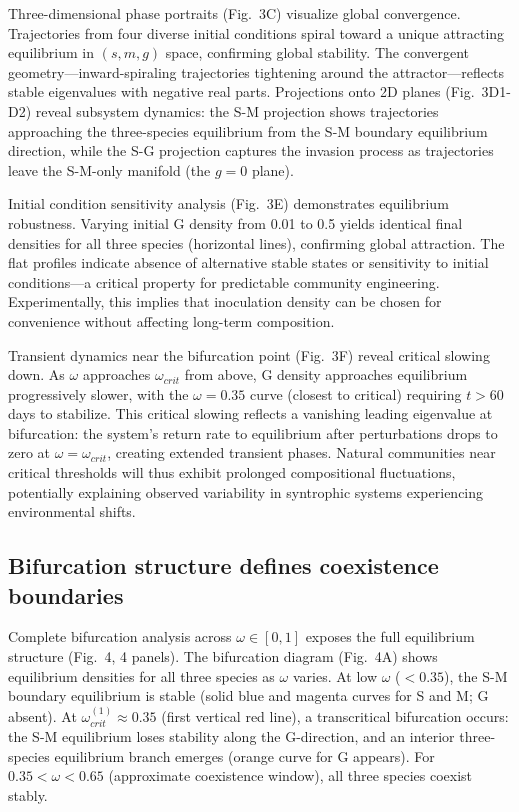 \documentclass[9pt,twocolumn,twoside]{pnas-new}
\begin{document}
Three-dimensional phase portraits (Fig.~3C) visualize global convergence. Trajectories from four diverse initial conditions spiral toward a unique attracting equilibrium in $(s, m, g)$ space, confirming global stability. The convergent geometry—inward-spiraling trajectories tightening around the attractor—reflects stable eigenvalues with negative real parts. Projections onto 2D planes (Fig.~3D1-D2) reveal subsystem dynamics: the S-M projection shows trajectories approaching the three-species equilibrium from the S-M boundary equilibrium direction, while the S-G projection captures the invasion process as trajectories leave the S-M-only manifold (the $g = 0$ plane).

Initial condition sensitivity analysis (Fig.~3E) demonstrates equilibrium robustness. Varying initial G density from 0.01 to 0.5 yields identical final densities for all three species (horizontal lines), confirming global attraction. The flat profiles indicate absence of alternative stable states or sensitivity to initial conditions—a critical property for predictable community engineering. Experimentally, this implies that inoculation density can be chosen for convenience without affecting long-term composition.

Transient dynamics near the bifurcation point (Fig.~3F) reveal critical slowing down. As $\omega$ approaches $\omega_{crit}$ from above, G density approaches equilibrium progressively slower, with the $\omega = 0.35$ curve (closest to critical) requiring $t > 60$ days to stabilize. This critical slowing reflects a vanishing leading eigenvalue at bifurcation: the system's return rate to equilibrium after perturbations drops to zero at $\omega = \omega_{crit}$, creating extended transient phases. Natural communities near critical thresholds will thus exhibit prolonged compositional fluctuations, potentially explaining observed variability in syntrophic systems experiencing environmental shifts.

\subsection*{Bifurcation structure defines coexistence boundaries}

Complete bifurcation analysis across $\omega \in [0,1]$ exposes the full equilibrium structure (Fig.~4, 4 panels). The bifurcation diagram (Fig.~4A) shows equilibrium densities for all three species as $\omega$ varies. At low $\omega$ ($< 0.35$), the S-M boundary equilibrium is stable (solid blue and magenta curves for S and M; G absent). At $\omega_{crit}^{(1)} \approx 0.35$ (first vertical red line), a transcritical bifurcation occurs: the S-M equilibrium loses stability along the G-direction, and an interior three-species equilibrium branch emerges (orange curve for G appears). For $0.35 < \omega < 0.65$ (approximate coexistence window), all three species coexist stably.
\end{document}
